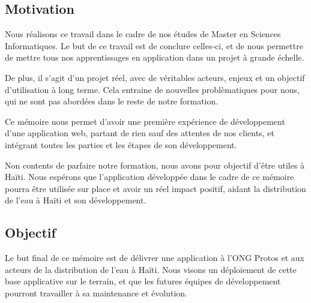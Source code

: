 \documentclass{eplmastersthesis_FR}
\begin{document}
		\subsection*{Motivation}

			Nous réalisons ce travail dans le cadre de nos études de Master en Sciences Informatiques. Le but de ce travail est de conclure celles-ci, et de nous permettre de mettre tous nos apprentissages en application dans un projet à grande échelle.

			De plus, il s'agit d'un projet réel, avec de véritables acteurs, enjeux et un objectif d'utilisation à long terme. Cela entraine de nouvelles problèmatiques pour nous, qui ne sont pas abordées dans le reste de notre formation.

			Ce mémoire nous permet d'avoir une première expérience de développement d'une application web, partant de rien sauf des attentes de nos clients, et intégrant toutes les parties et les étapes de son développement.

			Non contents de parfaire notre formation, nous avons pour objectif d'être utiles à Haïti. Nous espérons que l'application développée dans le cadre de ce mémoire pourra être utilisée sur place et avoir un réel impact positif, aidant la distribution de l'eau à Haïti et son développement.


		\subsection*{Objectif}

			Le but final de ce mémoire est de délivrer une application à l'ONG Protos et aux acteurs de la distribution de l'eau à Haïti. Nous visons un déploiement de cette base applicative sur le terrain, et que les futures équipes de développement pourront travailler à sa maintenance et évolution.
\end{document}
